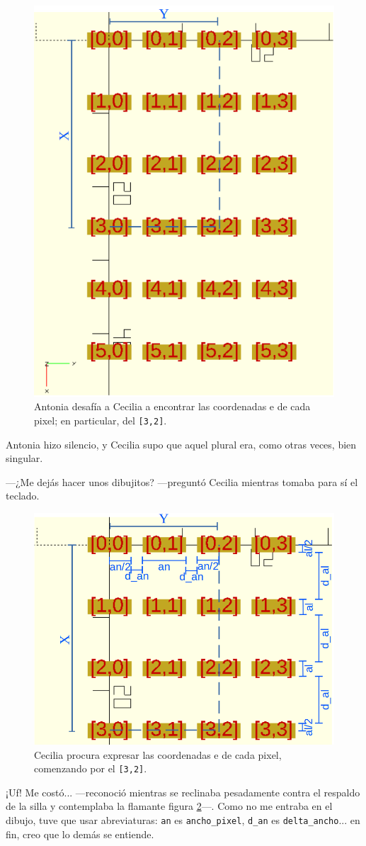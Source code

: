 \begin{figure}[ht]
  \centering
  \includegraphics[width=.42\textwidth]{imagenes/matriz-coordenadas-1}
  \caption{Antonia desafía a Cecilia a encontrar las coordenadas
     e  de cada pixel; en particular, del
    \texttt{[3,2]}.}
  \label{fig:matriz-coordenadas-1}
\end{figure}

Antonia hizo silencio, y Cecilia supo que aquel plural era, como otras
veces, bien singular.

---¿Me dejás hacer unos dibujitos? ---preguntó Cecilia mientras tomaba
para sí el teclado.

\begin{figure}[ht]
  \centering
  \includegraphics[width=.6\textwidth]{imagenes/matriz-coordenadas-4}
  \caption{Cecilia procura expresar las coordenadas  e
     de cada pixel, comenzando por el \texttt{[3,2]}.}
  \label{fig:matriz-coordenadas-4}
\end{figure}

\guillemotright ¡Uf! Me costó... ---reconoció mientras se reclinaba
pesadamente contra el respaldo de la silla y contemplaba la flamante
figura \ref{fig:matriz-coordenadas-4}---. Como no me entraba en el
dibujo, tuve que usar abreviaturas: \texttt{an} es
\texttt{ancho\_pixel}, \texttt{d\_an} es \texttt{delta\_ancho}... en
fin, creo que lo demás se entiende.

